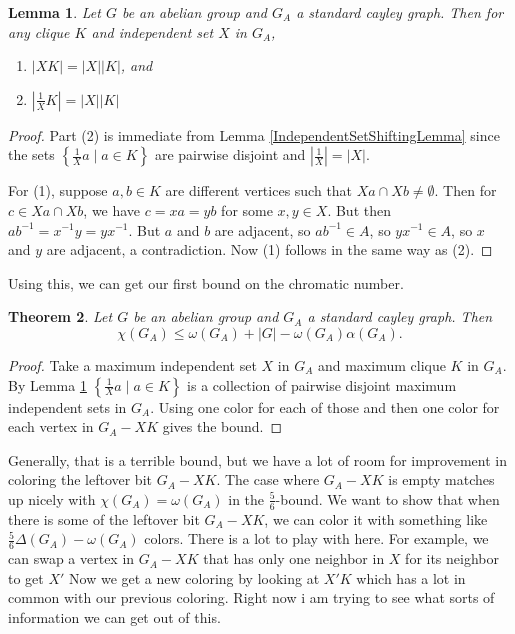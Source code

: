 \documentclass[12pt]{article}
\theoremstyle{plain}
\newtheorem{thm}{Theorem}[section]
\newtheorem{lem}[thm]{Lemma}
\theoremstyle{definition}
\theoremstyle{remark}
\newcommand{\setbs}[2]{\left\{ #1 \mid #2 \right\}}
\newcommand{\card}[1]{\left|#1\right|}
\begin{document}
\begin{lem}\label{IndependentSetShiftingLemmaAbelian}
Let $G$ be an abelian group and $G_A$ a standard cayley graph.   Then for any clique $K$ and independent set $X$ in $G_A$,
\begin{enumerate}
\item $\card{XK} = \card{X}\card{K}$, and\\
\item $\card{\frac{1}{X}K} = \card{X}\card{K}$
\end{enumerate}
\end{lem}
\begin{proof}
Part (2) is immediate from Lemma \ref{IndependentSetShiftingLemma} since the sets $\setbs{\frac{1}{X}a}{a \in K}$ are pairwise disjoint and $\card{\frac{1}{X}} = \card{X}$.

For (1), suppose $a,b \in K$ are different vertices such that $Xa \cap Xb \ne \emptyset$.  Then for $c \in Xa \cap Xb$, we have $c = xa = yb$ for some $x,y \in X$.  But then
$ab^{-1} = x^{-1}y = yx^{-1}$.  But $a$ and $b$ are adjacent, so $ab^{-1} \in A$, so $yx^{-1} \in A$, so $x$ and $y$ are adjacent, a contradiction.  Now (1) follows in the same way as (2).
\end{proof}
Using this, we can get our first bound on the chromatic number.
\begin{thm}\label{OmegaTilingColoring}
Let $G$ be an abelian group and $G_A$ a standard cayley graph.  Then 
\[\chi(G_A) \le \omega(G_A) + |G| - \omega(G_A)\alpha(G_A).\]
\end{thm}
\begin{proof}
Take a maximum independent set $X$ in $G_A$ and maximum clique $K$ in $G_A$.  By Lemma \ref{IndependentSetShiftingLemmaAbelian} $\setbs{\frac{1}{X}a}{a \in K}$ is 
a collection of pairwise disjoint maximum independent sets in $G_A$.  Using one color for each of those and then one color for each vertex in $G_A - XK$ gives the bound.
\end{proof}

Generally, that is a terrible bound, but we have a lot of room for improvement in coloring the leftover bit $G_A - XK$.  The case where $G_A - XK$ is empty matches up nicely
with $\chi(G_A) = \omega(G_A)$ in the $\frac56$-bound.  We want to show that when there is some of the leftover bit $G_A - XK$, we can color it with something like $\frac56\Delta(G_A) - \omega(G_A)$ colors.
There is a lot to play with here. For example, we can swap a vertex in $G_A - XK$ that has only one neighbor in $X$ for its neighbor to get $X'$  Now we get a new coloring by looking at $X'K$ which has a lot in common
with our previous coloring.  Right now i am trying to see what sorts of information we can get out of this.
\end{document}
